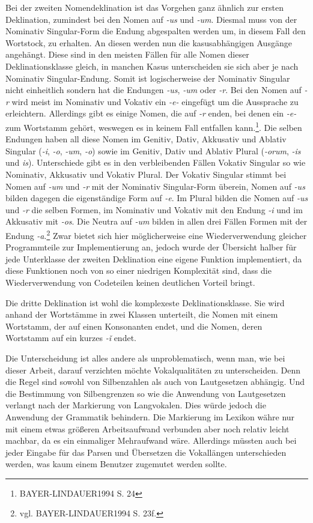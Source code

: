 \documentclass[12pt,abstract=on,titlepage,bibliography=totoc,ngerman,listof=totoc]{scrreprt}
\begin{document}
Bei der zweiten Nomendeklination ist das Vorgehen ganz ähnlich zur ersten Deklination, zumindest bei den Nomen auf \textit{-us} und \textit{-um}. Diesmal muss von der Nominativ Singular-Form die Endung abgespalten werden um, in diesem Fall den Wortstock, zu erhalten. An diesen werden nun die kasusabhängigen Ausgänge angehängt. Diese sind in den meisten Fällen für alle Nomen dieser Deklinationsklasse gleich, in manchen Kasus unterscheiden sie sich aber je nach Nominativ Singular-Endung. Somit ist logischerweise der Nominativ Singular nicht einheitlich sondern hat die Endungen \textit{-us}, \textit{-um} oder \textit{-r}. Bei den Nomen auf \textit{-r} wird meist im Nominativ und Vokativ ein \textit{-e-} eingefügt um die Aussprache zu erleichtern. Allerdings gibt es einige Nomen, die auf \textit{-r} enden, bei denen ein \textit{-e-} zum Wortstamm gehört, weswegen es in keinem Fall entfallen kann.\footnote{BAYER-LINDAUER1994 S. 24}. Die selben Endungen haben all diese Nomen im Genitiv, Dativ, Akkusativ und Ablativ Singular (\textit{-i}, \textit{-o}, \textit{-um}, \textit{-o}) sowie im Genitiv, Dativ und Ablativ Plural (\textit{-orum}, \textit{-is} und \textit{is}). Unterschiede gibt es in den verbleibenden Fällen Vokativ Singular so wie Nominativ, Akkusativ und Vokativ Plural. Der Vokativ Singular stimmt bei Nomen auf \textit{-um} und \textit{-r} mit der Nominativ Singular-Form überein, Nomen auf \textit{-us} bilden dagegen die eigenständige Form auf \textit{-e}. Im Plural bilden die Nomen auf \textit{-us} und \textit{-r} die selben Formen, im Nominativ und Vokativ mit den Endung \textit{-i} und im Akkusativ mit \textit{-os}. Die Neutra auf \textit{-um} bilden in allen drei Fällen Formen mit der Endung \textit{-a}.\footnote{vgl. BAYER-LINDAUER1994 S. 23f.} Zwar bietet sich hier möglicherweise eine Wiederverwendung gleicher Programmteile zur Implementierung an, jedoch wurde der Übersicht halber für jede Unterklasse der zweiten Deklination eine eigene Funktion implementiert, da diese Funktionen noch von so einer niedrigen Komplexität sind, dass die Wiederverwendung von Codeteilen keinen deutlichen Vorteil bringt. \par
Die dritte Deklination ist wohl die komplexeste Deklinationsklasse. Sie wird anhand der Wortstämme in zwei Klassen unterteilt, die Nomen mit einem Wortstamm, der auf einen Konsonanten endet, und die Nomen, deren Wortstamm auf ein kurzes \textit{-ǐ} endet. \par
Die Unterscheidung ist alles andere als unproblematisch, wenn man, wie bei dieser Arbeit, darauf verzichten möchte Vokalqualitäten zu unterscheiden. Denn die Regel sind sowohl von Silbenzahlen als auch von Lautgesetzen abhängig. Und die Bestimmung von Silbengrenzen so wie die Anwendung von Lautgesetzen verlangt nach der Markierung von Langvokalen. Dies würde jedoch die Anwendung der Grammatik behindern. Die Markierung im Lexikon währe nur mit einem etwas größeren Arbeitsaufwand verbunden aber noch relativ leicht machbar, da es ein einmaliger Mehraufwand wäre. Allerdings müssten auch bei jeder Eingabe für das Parsen und Übersetzen die Vokallängen unterschieden werden, was kaum einem Benutzer zugemutet werden sollte. \par
\end{document}
